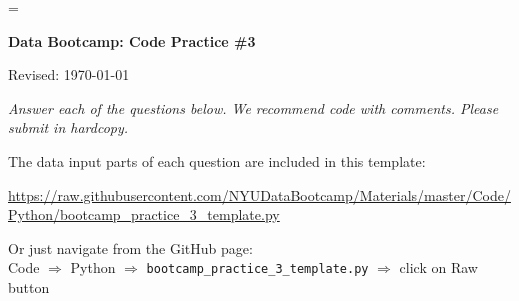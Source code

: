 \documentclass[11pt]{exam}
\begin{document}
\parskip=\bigskipamount
\parindent=0.0in
\thispagestyle{empty}


\bigskip\bigskip
\centerline{\Large \bf Data Bootcamp:  Code Practice \#3}
\centerline{Revised: \today}

{\it Answer each of the questions below.
We recommend code with comments.
Please submit in hardcopy.}

The data input parts of each question are included in this template:

\vspace{-0.06in}
{\small
\url{https://raw.githubusercontent.com/NYUDataBootcamp/Materials/master/Code/Python/bootcamp_practice_3_template.py}
}
\vspace{-0.06in}

Or just navigate from the GitHub page:  \\
Code $\Rightarrow$ Python $\Rightarrow$ \verb|bootcamp_practice_3_template.py| $\Rightarrow$ click on Raw button


\end{document}
